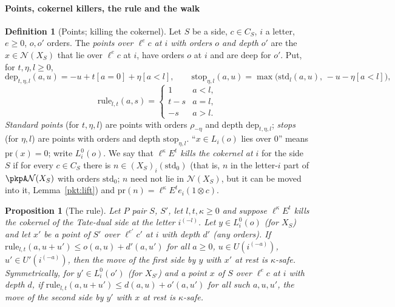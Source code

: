 \documentclass[10pt]{amsart}
\newtheorem{proposition}[theorem]{Proposition}
\theoremstyle{definition}
\newtheorem{definition}[theorem]{Definition}
\theoremstyle{remark}
\begin{document}
\paragraph*{Points, cokernel killers, the rule and the walk}

\begin{definition}[Points; killing the cokernel]\label{pkp:def-points}
Let $S$ be a side, $c\in C_S$, $i$ a letter, $e\ge0$, $o,o'$ orders. The \emph{points over $\ell^ec$ at
$i$ with orders $o$ and depth $o'$} are the $x\in\mathcal N(X_S)$ that lie over $\ell^ec$ at $i$, have
orders $o$ at $i$ and are deep for $o'$. Put, for $t,\eta,l\ge0$,
\[
\mathrm{dep}_{t,\eta,l}(a,u)=-u+t[a=0]+\eta[a<l],\qquad
\mathrm{stop}_{\eta,l}(a,u)=\max\bigl(\mathrm{std}_l(a,u),\,-u-\eta[a<l]\bigr),
\]
\[
\mathrm{rule}_{l,t}(a,s)=\begin{cases}1&a<l,\\ t-s&a=l,\\ -s&a>l.\end{cases}
\]
\emph{Standard points} (for $t,\eta,l$) are points with orders $\rho_{-\eta}$ and depth
$\mathrm{dep}_{t,\eta,l}$; \emph{stops} (for $\eta,l$) are points with orders and depth
$\mathrm{stop}_{\eta,l}$. ``$x\in L_i(o)$ lies over $0$'' means $\mathrm{pr}(x)=0$; write
$L^0_i(o)$. We say that \emph{$\ell^\kappa E^t$ kills the cokernel at $i$} for the side $S$ if for
every $c\in C_S$ there is $n\in(X_S)_i(\mathrm{std}_0)$ (that is, $n$ in the letter-$i$ part of
$\pkpA\mathcal N(X_S)$ with orders $\mathrm{std}_0$; $n$ need not lie in $\mathcal N(X_S)$, but it can
be moved into it, Lemma~\ref{pkt:lift}) and $\mathrm{pr}(n)=\ell^\kappa E^t
e_i(1\otimes c)$.
\end{definition}

\begin{proposition}[The rule]\label{pkp:rule}
Let $P$ pair $S$, $S'$, let $l,t,\kappa\ge0$ and suppose $\ell^\kappa E^t$ kills the cokernel of
the Tate-dual side at the letter $i^{(-l)}$. Let $y\in L^0_i(o)$ (for $X_S$) and let $x'$ be a point
of $S'$ over $\ell^{e'}c'$ at $i$ with depth $d'$ (any orders). If
$\mathrm{rule}_{l,t}(a,u+u')\le o(a,u)+d'(a,u')$ for all $a\ge0$, $u\in U(i^{(-a)})$, $u'\in
U'(i^{(-a)})$, then the move of the first side by $y$ with $x'$ at rest is $\kappa$-safe. Symmetrically,
for $y'\in L^0_i(o')$ (for $X_{S'}$) and a point $x$ of $S$ over $\ell^ec$ at $i$ with depth $d$, if
$\mathrm{rule}_{l,t}(a,u+u')\le d(a,u)+o'(a,u')$ for all such $a,u,u'$, the move of the second side
by $y'$ with $x$ at rest is $\kappa$-safe.
\end{proposition}
\end{document}
